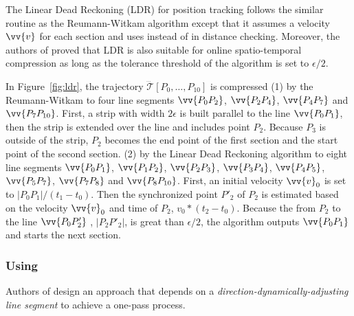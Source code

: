 {{The Linear Dead Reckoning (LDR)\cite{Lange:Tracking} for position tracking follows the similar routine as the Reumann-Witkam algorithm except that it assumes a velocity ${\vv{v}}$ for each section and uses \sed instead of \ped in distance checking.
Moreover, the authors of \cite{Trajcevski:DDR} proved that LDR is also suitable for online spatio-temporal compression as long as the tolerance threshold of the algorithm is set to $\epsilon/2$.}

\begin{example}
\label{exm-alg-strip}
In Figure~\ref{fig:ldr}, the trajectory $\dddot{\mathcal{T}}[P_0, \ldots, P_{10}]$ is compressed
%
(1) by the Reumann-Witkam to four line segments $\vv{P_0P_2}$, $\vv{P_2P_4}$, $\vv{P_4P_7}$ and $\vv{P_7P_{10}}$. First, a strip with width $2\epsilon$ is built parallel to the line $\vv{P_0P_1}$, then the strip is extended over the line and includes point $P_2$. Because $P_3$ is outside of the strip, $P_2$ becomes the end point of the first section and the start point of the second section.
%
(2) by the Linear Dead Reckoning algorithm to eight line segments $\vv{P_0P_1}$, $\vv{P_1P_2}$, $\vv{P_2P_3}$, $\vv{P_3P_4}$, $\vv{P_4P_5}$, $\vv{P_5P_7}$, $\vv{P_7P_8}$ and $\vv{P_8P_{10}}$. First, an initial velocity ${\vv{v}_0}$ is set to $|P_0P_1|/(t_1-t_0)$. Then the synchronized point $P'_2$ of $P_2$ is estimated based on the velocity ${\vv{v}_0}$ and time of $P_2$, \ie ${v}_0 * (t_2-t_0)$. Because the \sed from $P_2$ to the line $\vv{P_0P'_2}$ , \ie $|P_2P'_2|$, is great than $\epsilon/2$, the algorithm outputs $\vv{P_0P_1}$ and starts the next section.
\end{example}

}%

\subsubsection{\operb Using \ped}
\label{sec-operb}

Authors of \operb \cite{Lin:Operb} design an approach that depends on a \emph{direction-dynamically-adjusting line segment} to achieve a one-pass process.

